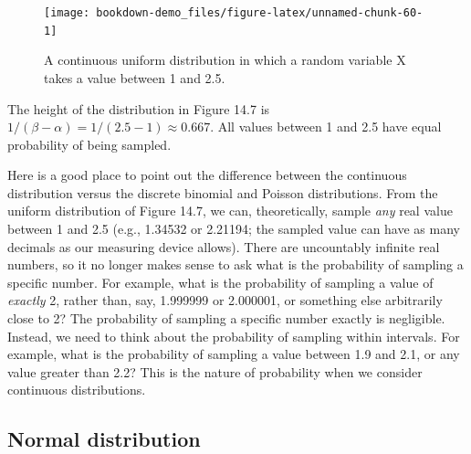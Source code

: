 \documentclass[
]{scrbook}
\begin{document}
\begin{figure}
\texttt{[image: bookdown-demo\_files/figure-latex/unnamed-chunk-60-1]} \caption{A continuous uniform distribution in which a random variable X takes a value between 1 and 2.5.}\label{fig:unnamed-chunk-60}
\end{figure}

The height of the distribution in Figure 14.7 is \(1/(\beta - \alpha) = 1/(2.5 - 1) \approx 0.667\).
All values between 1 and 2.5 have equal probability of being sampled.

Here is a good place to point out the difference between the continuous distribution versus the discrete binomial and Poisson distributions.
From the uniform distribution of Figure 14.7, we can, theoretically, sample \emph{any} real value between 1 and 2.5 (e.g., 1.34532 or 2.21194; the sampled value can have as many decimals as our measuring device allows).
There are uncountably infinite real numbers, so it no longer makes sense to ask what is the probability of sampling a specific number.
For example, what is the probability of sampling a value of \emph{exactly} 2, rather than, say, 1.999999 or 2.000001, or something else arbitrarily close to 2?
The probability of sampling a specific number exactly is negligible.
Instead, we need to think about the probability of sampling within intervals.
For example, what is the probability of sampling a value between 1.9 and 2.1, or any value greater than 2.2?
This is the nature of probability when we consider continuous distributions.

\hypertarget{normal-distribution}{%
\subsection{Normal distribution}\label{normal-distribution}}
\end{document}
